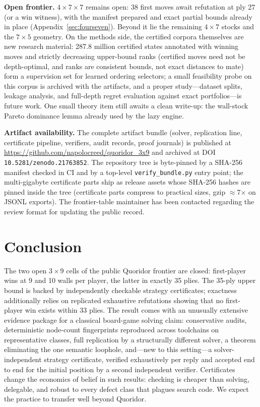 \documentclass[conference]{IEEEtran}
\newcommand{\varSpec}[3]{$#1{\times}#2{\times}#3$}
\begin{document}
\textbf{Open frontier.} \varSpec{4}{7}{7} remains open: 38 first moves await refutation at ply 27 (or a win witness), with the manifest prepared and exact partial bounds already in place (Appendix~\ref{sec:fourseven}). Beyond it lie the remaining $4\times 7$ stocks and the $7\times 5$ geometry. On the methods side, the certified corpora themselves are new research material: 287.8 million certified states annotated with winning moves and strictly decreasing upper-bound ranks (certified moves need not be depth-optimal, and ranks are consistent bounds, not exact distances to mate) form a supervision set for learned ordering selectors; a small feasibility probe on this corpus is archived with the artifacts, and a proper study---dataset splits, leakage analysis, and full-depth regret evaluation against exact portfolios---is future work. One small theory item still awaits a clean write-up: the wall-stock Pareto dominance lemma already used by the lazy engine.

\textbf{Artifact availability.} The complete artifact bundle (solver, replication line, certificate pipeline, verifiers, audit records, proof journals) is published at \url{https://github.com/napolocreed/quoridor_3x9} and archived at DOI \texttt{10.5281/zenodo.21763852}. The repository tree is byte-pinned by a SHA-256 manifest checked in CI and by a top-level \texttt{verify\_bundle.py} entry point; the multi-gigabyte certificate parts ship as release assets whose SHA-256 hashes are pinned inside the tree (certificate parts compress to practical sizes, gzip $\approx$7$\times$ on JSONL exports). The frontier-table maintainer has been contacted regarding the review format for updating the public record.

\section{Conclusion}
\label{sec:conclusion}

The two open $3\times 9$ cells of the public Quoridor frontier are closed: first-player wins at 9 and 10 walls per player, the latter in exactly 35 plies. The 35-ply upper bound is backed by independently checkable strategy certificates; exactness additionally relies on replicated exhaustive refutations showing that no first-player win exists within 33 plies. The result comes with an unusually extensive evidence package for a classical board-game solving claim: conservative audits, deterministic node-count fingerprints reproduced across toolchains on representative classes, full replication by a structurally different solver, a theorem eliminating the one semantic loophole, and---new to this setting---a solver-independent strategy certificate, verified exhaustively per reply and accepted end to end for the initial position by a second independent verifier. Certificates change the economics of belief in such results: checking is cheaper than solving, delegable, and robust to every defect class that plagues search code. We expect the practice to transfer well beyond Quoridor.
\end{document}
